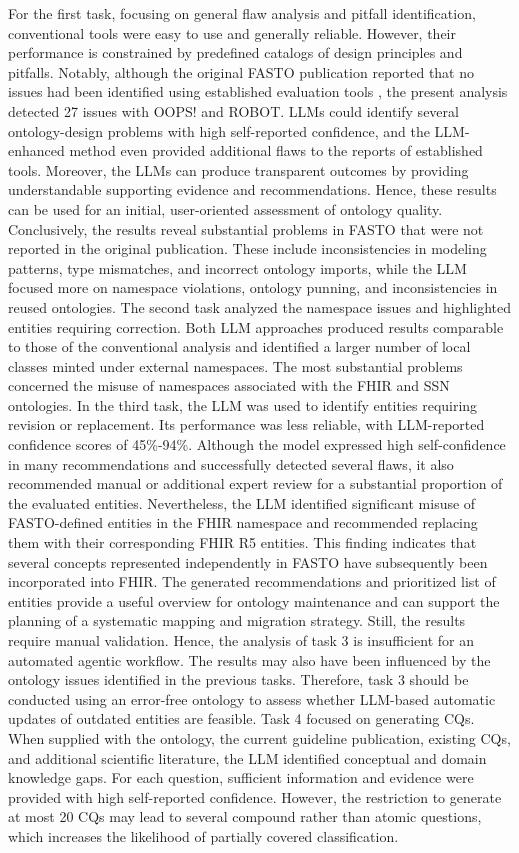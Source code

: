 \documentclass[
]{ceurart}
\begin{document}
For the first task, focusing on general flaw analysis and pitfall identification, conventional tools were easy to use and generally reliable. However, their performance is constrained by predefined catalogs of design principles and pitfalls. Notably, although the original FASTO publication reported that no issues had been identified using established evaluation tools \cite{ElSappagh2019_FASTO}, the present analysis detected 27 issues with OOPS! and ROBOT. LLMs could identify several ontology-design problems with high self-reported confidence, and the LLM-enhanced method even provided additional flaws to the reports of established tools. Moreover, the LLMs can produce transparent outcomes by providing understandable supporting evidence and recommendations. Hence, these results can be used for an initial, user-oriented assessment of ontology quality. Conclusively, the results reveal substantial problems in FASTO that were not reported in the original publication. These include inconsistencies in modeling patterns, type mismatches, and incorrect ontology imports, while the LLM focused more on namespace violations, ontology punning, and inconsistencies in reused ontologies. The second task analyzed the namespace issues and highlighted entities requiring correction. Both LLM approaches produced results comparable to those of the conventional analysis and identified a larger number of local classes minted under external namespaces. The most substantial problems concerned the misuse of namespaces associated with the FHIR and SSN ontologies. In the third task, the LLM was used to identify entities requiring revision or replacement. Its performance was less reliable, with LLM-reported confidence scores of 45\%-94\%. Although the model expressed high self-confidence in many recommendations and successfully detected several flaws, it also recommended manual or additional expert review for a substantial proportion of the evaluated entities. Nevertheless, the LLM identified significant misuse of FASTO-defined entities in the FHIR namespace and recommended replacing them with their corresponding FHIR R5 entities. This finding indicates that several concepts represented independently in FASTO have subsequently been incorporated into FHIR. The generated recommendations and prioritized list of entities provide a useful overview for ontology maintenance and can support the planning of a systematic mapping and migration strategy. Still, the results require manual validation. Hence, the analysis of task 3 is insufficient for an automated agentic workflow. The results may also have been influenced by the ontology issues identified in the previous tasks. Therefore, task 3 should be conducted using an error-free ontology to assess whether LLM-based automatic updates of outdated entities are feasible. Task 4 focused on generating CQs. When supplied with the ontology, the current guideline publication, existing CQs, and additional scientific literature, the LLM identified conceptual and domain knowledge gaps. For each question, sufficient information and evidence were provided with high self-reported confidence. However, the restriction to generate at most 20 CQs may lead to several compound rather than atomic questions, which increases the likelihood of partially covered classification. 
\end{document}
